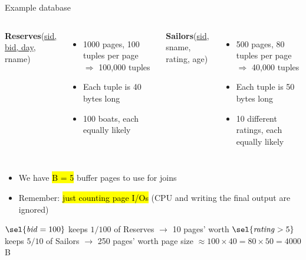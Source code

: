 \begin{frame}{Example database }
  \begin{columns}[T]
      \textbf{Reserves}(\underline{sid, bid, day}, rname)
      \begin{itemize}\small
        \item 1000 pages, 100 tuples per page $\Rightarrow$ 100,000 tuples
        \item Each tuple is 40 bytes long
        \item 100 boats, each equally likely
      \end{itemize}
      \textbf{Sailors}(\underline{sid}, sname, rating, age)
      \begin{itemize}\small
        \item 500 pages, 80 tuples per page $\Rightarrow$ 40,000 tuples
        \item Each tuple is 50 bytes long
        \item 10 different ratings, each equally likely
      \end{itemize}
  \end{columns}
  \vspace{2mm}
  \begin{itemize}
    \item We have \hl{B = 5} buffer pages to use for joins
    \item Remember: \hl{just counting page I/Os} (CPU and writing the final output are ignored)
  \end{itemize}
  \begin{extrabox}
    $\sel{\mathit{bid}=100}$ keeps $1/100$ of Reserves $\to$ 10 pages' worth \quad
    $\sel{\mathit{rating}>5}$ keeps $5/10$ of Sailors $\to$ 250 pages' worth \quad
    page size $\approx 100 \times 40 = 80 \times 50 = 4000$ B
  \end{extrabox}
\end{frame}

